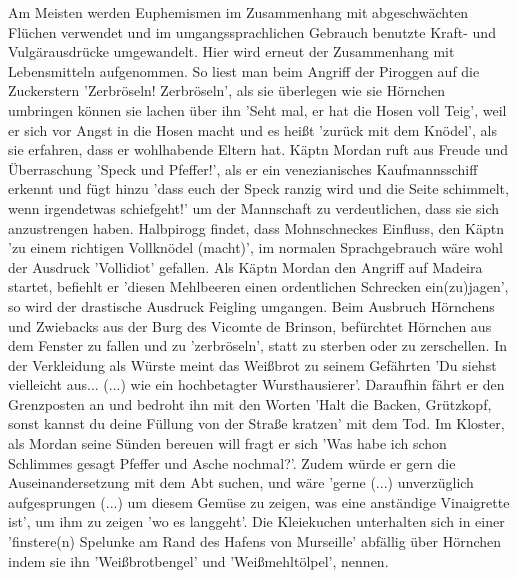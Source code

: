 {Am Meisten werden Euphemismen im Zusammenhang mit abgeschwächten Flüchen verwendet und im umgangssprachlichen Gebrauch benutzte Kraft- und Vulgärausdrücke umgewandelt. Hier wird erneut der Zusammenhang mit Lebensmitteln aufgenommen. So liest man beim Angriff der Piroggen auf die Zuckerstern \cite[S.30ff]{pir}'Zerbröseln! Zerbröseln',\cite[S.33]{pir} als sie überlegen wie sie Hörnchen umbringen können\cite[S.33]{pir} sie lachen über ihn 'Seht mal, er hat die Hosen voll Teig',\cite[S.33]{pir} weil er sich vor Angst in die Hosen macht \cite[S.33]{pir} und es heißt 'zurück mit dem Knödel',\cite[S.34]{pir} als sie erfahren, dass er wohlhabende Eltern hat.\cite[S.34]{pir} Käptn Mordan ruft aus Freude und Überraschung 'Speck und Pfeffer!',\cite[S.51]{pir} als er ein venezianisches Kaufmannsschiff erkennt \cite[S.51]{pir} und fügt hinzu 'dass euch der Speck ranzig wird und die Seite schimmelt, wenn irgendetwas schiefgeht!'\cite[S.51]{pir} um der Mannschaft zu verdeutlichen, dass sie sich anzustrengen haben. Halbpirogg findet, dass Mohnschneckes Einfluss, den Käptn 'zu einem richtigen Vollknödel (macht)',\cite[S.145]{pir} im normalen Sprachgebrauch wäre wohl der Ausdruck 'Vollidiot' gefallen. Als Käptn Mordan den Angriff auf Madeira startet, befiehlt er 'diesen Mehlbeeren einen ordentlichen Schrecken ein(zu)jagen'\cite[S.188]{pir}, so wird der drastische Ausdruck Feigling umgangen. Beim Ausbruch Hörnchens und Zwiebacks aus der Burg des Vicomte de Brinson, \cite[S.240]{pir} befürchtet Hörnchen aus dem Fenster zu fallen und zu 'zerbröseln',\cite[S.240]{pir} statt zu sterben oder zu zerschellen. In der Verkleidung als Würste \cite[S.286]{pir} meint das Weißbrot zu seinem Gefährten 'Du siehst vielleicht aus... (...) wie ein hochbetagter Wursthausierer'.\cite[S.287]{pir} Daraufhin fährt er den Grenzposten an \cite[S.287]{pir} und bedroht ihn mit den Worten 'Halt die Backen, Grützkopf, sonst kannst du deine Füllung von der Straße kratzen' mit dem Tod. Im Kloster, als Mordan seine Sünden bereuen will fragt er sich 'Was habe ich schon Schlimmes gesagt Pfeffer und Asche nochmal?'. \cite[S.468]{pir} Zudem würde er gern die Auseinandersetzung mit dem Abt suchen, \cite[S.468]{pir} und wäre 'gerne (...) unverzüglich aufgesprungen  (...) um diesem Gemüse zu zeigen, was eine anständige Vinaigrette ist',\cite[S.468]{pir} um ihm zu zeigen 'wo es langgeht'. Die Kleiekuchen unterhalten sich in einer 'finstere(n) Spelunke am Rand des Hafens von Murseille'\cite[S.535f]{pir} abfällig über Hörnchen indem sie ihn 'Weißbrotbengel' \cite[S.537]{pir} und 'Weißmehltölpel',\cite[S.537]{pir} nennen.

}
